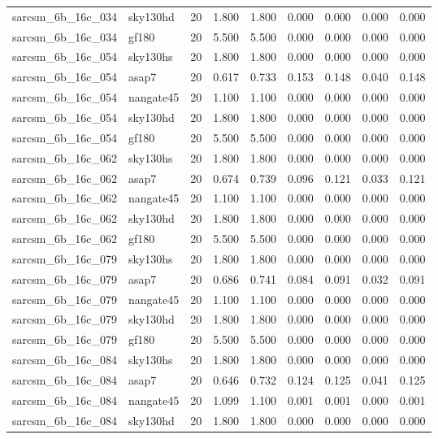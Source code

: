 \begin{tabular}{llrrrrrrr}
sarcsm\_6b\_16c\_034 & sky130hd & 20 & 1.800 & 1.800 & 0.000 & 0.000 & 0.000 & 0.000 \\
sarcsm\_6b\_16c\_034 & gf180 & 20 & 5.500 & 5.500 & 0.000 & 0.000 & 0.000 & 0.000 \\
sarcsm\_6b\_16c\_054 & sky130hs & 20 & 1.800 & 1.800 & 0.000 & 0.000 & 0.000 & 0.000 \\
sarcsm\_6b\_16c\_054 & asap7 & 20 & 0.617 & 0.733 & 0.153 & 0.148 & 0.040 & 0.148 \\
sarcsm\_6b\_16c\_054 & nangate45 & 20 & 1.100 & 1.100 & 0.000 & 0.000 & 0.000 & 0.000 \\
sarcsm\_6b\_16c\_054 & sky130hd & 20 & 1.800 & 1.800 & 0.000 & 0.000 & 0.000 & 0.000 \\
sarcsm\_6b\_16c\_054 & gf180 & 20 & 5.500 & 5.500 & 0.000 & 0.000 & 0.000 & 0.000 \\
sarcsm\_6b\_16c\_062 & sky130hs & 20 & 1.800 & 1.800 & 0.000 & 0.000 & 0.000 & 0.000 \\
sarcsm\_6b\_16c\_062 & asap7 & 20 & 0.674 & 0.739 & 0.096 & 0.121 & 0.033 & 0.121 \\
sarcsm\_6b\_16c\_062 & nangate45 & 20 & 1.100 & 1.100 & 0.000 & 0.000 & 0.000 & 0.000 \\
sarcsm\_6b\_16c\_062 & sky130hd & 20 & 1.800 & 1.800 & 0.000 & 0.000 & 0.000 & 0.000 \\
sarcsm\_6b\_16c\_062 & gf180 & 20 & 5.500 & 5.500 & 0.000 & 0.000 & 0.000 & 0.000 \\
sarcsm\_6b\_16c\_079 & sky130hs & 20 & 1.800 & 1.800 & 0.000 & 0.000 & 0.000 & 0.000 \\
sarcsm\_6b\_16c\_079 & asap7 & 20 & 0.686 & 0.741 & 0.084 & 0.091 & 0.032 & 0.091 \\
sarcsm\_6b\_16c\_079 & nangate45 & 20 & 1.100 & 1.100 & 0.000 & 0.000 & 0.000 & 0.000 \\
sarcsm\_6b\_16c\_079 & sky130hd & 20 & 1.800 & 1.800 & 0.000 & 0.000 & 0.000 & 0.000 \\
sarcsm\_6b\_16c\_079 & gf180 & 20 & 5.500 & 5.500 & 0.000 & 0.000 & 0.000 & 0.000 \\
sarcsm\_6b\_16c\_084 & sky130hs & 20 & 1.800 & 1.800 & 0.000 & 0.000 & 0.000 & 0.000 \\
sarcsm\_6b\_16c\_084 & asap7 & 20 & 0.646 & 0.732 & 0.124 & 0.125 & 0.041 & 0.125 \\
sarcsm\_6b\_16c\_084 & nangate45 & 20 & 1.099 & 1.100 & 0.001 & 0.001 & 0.000 & 0.001 \\
sarcsm\_6b\_16c\_084 & sky130hd & 20 & 1.800 & 1.800 & 0.000 & 0.000 & 0.000 & 0.000 \\

\end{tabular}
